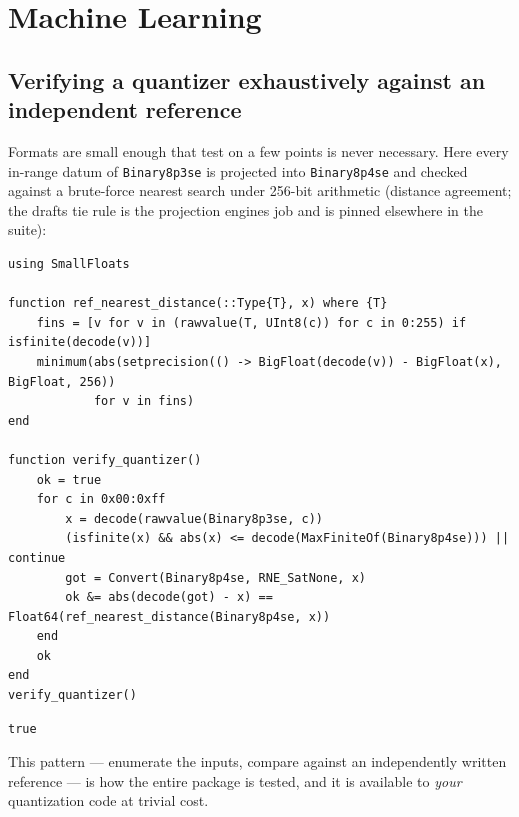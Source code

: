 \section{Machine Learning}



\label{11381515430689351323}{}


\subsection{Verifying a quantizer exhaustively against an independent reference}



\label{15080892262823953367}{}


Formats are small enough that {\textquotedbl}test on a few points{\textquotedbl} is never necessary. Here every in-range datum of \texttt{Binary8p3se} is projected into \texttt{Binary8p4se} and checked against a brute-force nearest search under 256-bit arithmetic (distance agreement; the draft{\textquotesingle}s tie rule is the projection engine{\textquotesingle}s job and is pinned elsewhere in the suite):




\begin{verbatim}
using SmallFloats

function ref_nearest_distance(::Type{T}, x) where {T}
    fins = [v for v in (rawvalue(T, UInt8(c)) for c in 0:255) if isfinite(decode(v))]
    minimum(abs(setprecision(() -> BigFloat(decode(v)) - BigFloat(x), BigFloat, 256))
            for v in fins)
end

function verify_quantizer()
    ok = true
    for c in 0x00:0xff
        x = decode(rawvalue(Binary8p3se, c))
        (isfinite(x) && abs(x) <= decode(MaxFiniteOf(Binary8p4se))) || continue
        got = Convert(Binary8p4se, RNE_SatNone, x)
        ok &= abs(decode(got) - x) == Float64(ref_nearest_distance(Binary8p4se, x))
    end
    ok
end
verify_quantizer()
\end{verbatim}




\begin{verbatim}
true
\end{verbatim}



This pattern — enumerate the inputs, compare against an independently written reference — is how the entire package is tested, and it is available to \emph{your} quantization code at trivial cost.



